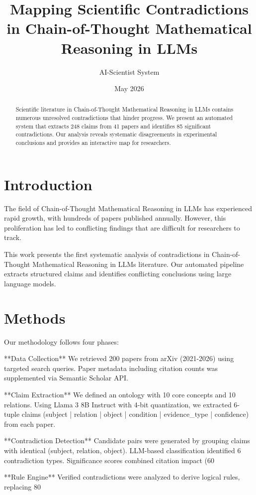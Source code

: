 \documentclass[11pt]{article}
\title{Mapping Scientific Contradictions in Chain-of-Thought Mathematical Reasoning in LLMs}
\author{AI-Scientist System}
\date{May 2026}
\begin{document}
\maketitle

\begin{abstract}
Scientific literature in Chain-of-Thought Mathematical Reasoning in LLMs contains numerous unresolved contradictions that hinder progress. 
We present an automated system that extracts 248 claims from 41 papers and identifies 85 significant contradictions. 
Our analysis reveals systematic disagreements in experimental conclusions and provides an interactive map for researchers.
\end{abstract}

\section{Introduction}
The field of Chain-of-Thought Mathematical Reasoning in LLMs has experienced rapid growth, with hundreds of papers published annually.
However, this proliferation has led to conflicting findings that are difficult for researchers to track.

This work presents the first systematic analysis of contradictions in Chain-of-Thought Mathematical Reasoning in LLMs literature.
Our automated pipeline extracts structured claims and identifies conflicting conclusions using large language models.

\section{Methods}
Our methodology follows four phases:

**Data Collection** We retrieved 200 papers from arXiv (2021-2026) using targeted search queries.
Paper metadata including citation counts was supplemented via Semantic Scholar API.

**Claim Extraction** We defined an ontology with 10 core concepts and 10 relations.
Using Llama 3 8B Instruct with 4-bit quantization, we extracted 6-tuple claims 
(subject | relation | object | condition | evidence_type | confidence) from each paper.

**Contradiction Detection** Candidate pairs were generated by grouping claims with identical (subject, relation, object).
LLM-based classification identified 6 contradiction types.
Significance scores combined citation impact (60%

**Rule Engine** Verified contradictions were analyzed to derive logical rules,
replacing 80%
\end{document}
